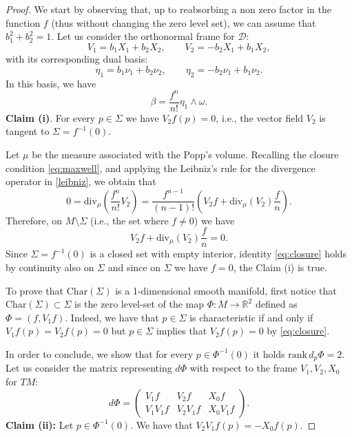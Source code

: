 \documentclass[10pt,a4paper]{amsart}
\newcommand{\B}{\beta}
\newcommand{\R}{\mathbb{R}}
\newcommand{\diff}{d}%
\newcommand{\distr}{\mathcal{D}}								%
\begin{document}
\begin{proof}
We start by observing that, up to reabsorbing a non zero factor in the function $f$ (thus without changing the zero level set), we can assume that $b_1^2+b_2^2=1$.
Let us consider the orthonormal frame for $\distr$:
\begin{equation}
V_1= b_1X_1+b_2X_2, \qquad V_2 = -b_2X_1+b_1X_2,
\end{equation}
with its corresponding dual basis:
\begin{equation}
\eta_1= b_1\nu_1+b_2\nu_2, \qquad \eta_2=-b_2\nu_1+b_1\nu_2.
\end{equation}
In this basis, we have
\begin{equation}
\B=\frac{f^n}{n!}\eta_1\wedge\omega.
\end{equation}
{\bf Claim (i)}. For every $p\in \Sigma$ we have $V_2f(p)=0$, i.e., the vector field $V_{2}$ is tangent to $\Sigma=f^{-1}(0)$.

\smallskip
Let $\mu$ be the measure associated with the Popp's volume.
Recalling the closure condition \eqref{eq:maxwell}, and applying the Leibniz's rule for the divergence operator in \eqref{leibniz}, we obtain that  
\begin{equation}
0=\mathrm{div}_\mu\left(\frac{f^n}{n!}V_2\right)=\frac{f^{n-1}}{(n-1)!}\left(V_2f+\mathrm{div}_\mu(V_2)\frac{f}{n}\right).
\end{equation}
Therefore, on $M\setminus \Sigma$ (i.e., the set where $f\neq 0$) we have
\begin{equation}
\label{eq:closure}
V_2f+\mathrm{div}_\mu(V_2)\frac{f}{n}=0.
\end{equation} 
Since $\Sigma=f^{-1}(0)$ is a closed set with empty interior, identity \eqref{eq:closure} holds by continuity also on $\Sigma$ and since on $
\Sigma$ we have $f=0$, the Claim (i) is true.

\smallskip
To prove that $\mathrm{Char}(\Sigma)$ is a 1-dimensional smooth manifold, first notice that $\mathrm{Char}(\Sigma)\subset \Sigma$ is the zero level-set of the map $\Phi:M\to \R^2$ defined as $\Phi=(f,V_1f)$. 
Indeed, we have that $p\in \Sigma$ is characteristic if and only if  $V_1f(p)=V_2f(p)=0$ but  $p\in \Sigma$ implies that $V_2f(p)=0$ by \eqref{eq:closure}.

In order to conclude, we show that  for every $p\in \Phi^{-1}(0)$ it holds $\mathrm{rank}\, \diff _p\Phi=2$.
Let us consider the matrix representing $\diff \Phi$ with respect to the frame $V_1,V_2, X_0$ for $TM$:
\begin{equation}\label{eq:db130}
\diff \Phi =
\left( \begin{array}{ccc}
V_1f & V_2f &X_0f \\
V_1V_1f &V_2 V_1f & X_0 V_1f
\end{array} \right).
\end{equation}
{\bf Claim (ii):} Let $p\in \Phi^{-1}(0)$. We have that $V_2V_1f(p)= -X_0f(p)$.


\end{proof}
\end{document}
